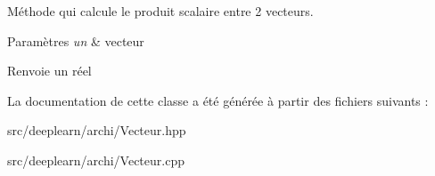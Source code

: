 Méthode qui calcule le produit scalaire entre 2 vecteurs. 


\begin{DoxyParams}{Paramètres}
{\em un} & vecteur \\
\hline
\end{DoxyParams}
\begin{DoxyReturn}{Renvoie}
un réel 
\end{DoxyReturn}


La documentation de cette classe a été générée à partir des fichiers suivants \+:\begin{DoxyCompactItemize}
\item 
src/deeplearn/archi/Vecteur.\+hpp\item 
src/deeplearn/archi/Vecteur.\+cpp\end{DoxyCompactItemize}
